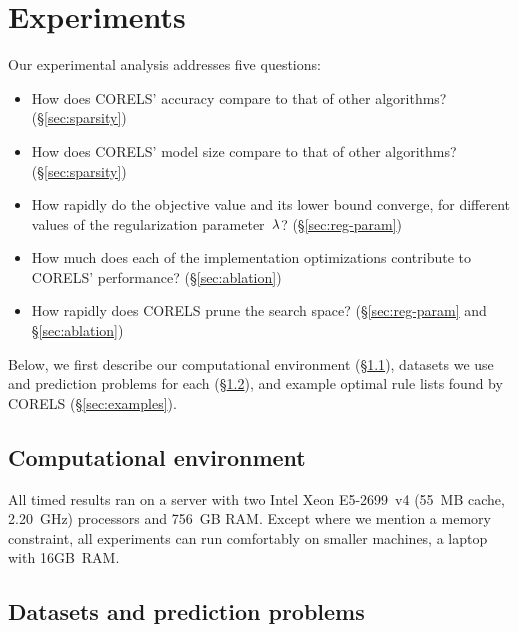 \section{Experiments}
\label{sec:experiments}

Our experimental analysis addresses five questions:
\begin{itemize}
\item How does CORELS' accuracy compare to that of other algorithms? (\S\ref{sec:sparsity})
\item How does CORELS' model size compare to that of other algorithms? (\S\ref{sec:sparsity})
\item How rapidly do the objective value and its lower bound converge,
for different values of the regularization parameter~${\lambda}$? (\S\ref{sec:reg-param})
\item How much does each of the implementation optimizations contribute to CORELS' performance? (\S\ref{sec:ablation})
\item How rapidly does CORELS prune the search space? (\S\ref{sec:reg-param} and \S\ref{sec:ablation})
\end{itemize}
Below, we first describe our computational environment (\S\ref{sec:environment}),
datasets we use and prediction problems for each (\S\ref{sec:datasets}),
and example optimal rule lists found by CORELS (\S\ref{sec:examples}).

\subsection{Computational environment}
\label{sec:environment}

All timed results ran on a server with two Intel Xeon E5-2699~v4
(55~MB cache, 2.20~GHz) processors and 756~GB RAM.
%
Except where we mention a memory constraint, all experiments
can run comfortably on smaller machines, \eg a laptop with 16GB~RAM.

\subsection{Datasets and prediction problems}
\label{sec:datasets}

